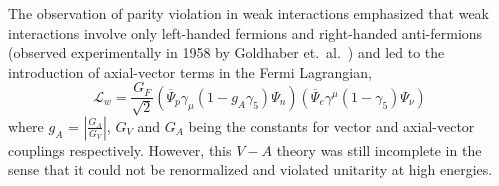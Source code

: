 The observation of parity violation in weak interactions emphasized that weak interactions involve only left-handed fermions and right-handed anti-fermions
(observed experimentally in 1958 by Goldhaber et.\ al.~\cite{Goldhaber:1958nb}) and led to the introduction of axial-vector terms in the Fermi Lagrangian,
\begin{equation}
\mathcal{L}_{w} = \frac{G_{F}}{\sqrt{2}}(\overline{\Psi}_{p}\gamma_{\mu}(1 - g_{A}\gamma_{5}){\Psi}_{n})(\overline{\Psi}_{e}\gamma^{\mu}(1 - \gamma_{5}){\Psi}_{\nu})
\end{equation}
where $g_{A}$ = $|\frac{G_{A}}{G_{V}}|$, $G_{V}$ and $G_{A}$ being the constants for vector and axial-vector couplings respectively.
However, this $V - A$ theory was still incomplete in the sense that
it could not be renormalized and violated unitarity at high energies.

